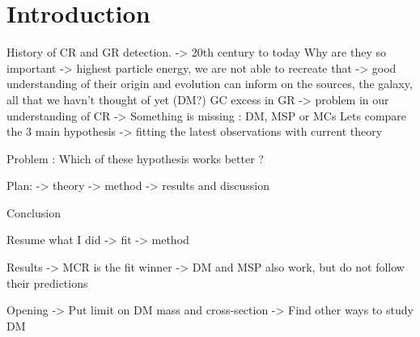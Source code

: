 \chapter*{Introduction}
\label{ch:introduction}



History of CR  and GR detection.
	-> 20th century to today
Why are they so important
	-> highest particle energy, we are not able to recreate that
	-> good understanding of their origin and evolution can inform on the sources, the galaxy, all that we havn't thought of yet (DM?)
GC excess in GR
	-> problem in our understanding of CR
	-> Something is missing : DM, MSP or MCs
Lets compare the 3 main hypothesis
	-> fitting the latest observations with current theory

Problem : Which of these hypothesis works better ?
	
Plan:
	-> theory
	-> method
	-> results and discussion


	
	

Conclusion

Resume what I did
	-> fit
	-> method

Results
	-> MCR is the fit winner
	-> DM and MSP also work, but do not follow their predictions

Opening
	-> Put limit on DM mass and cross-section
	-> Find other ways to study DM

